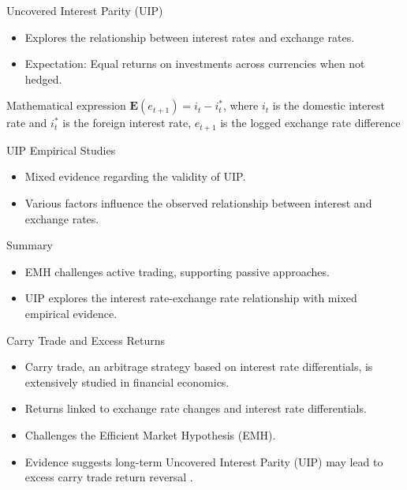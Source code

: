 \documentclass{beamer}
\begin{document}
\begin{frame}{Uncovered Interest Parity (UIP)}
    \begin{itemize}
        \item Explores the relationship between interest rates and exchange rates.
        \item Expectation: Equal returns on investments across currencies when not hedged.
    \end{itemize}

    \begin{block}{Mathematical expression}
    \( \mathbf{E}(e_{t+1}) = i_t - i^*_t \), where $i_t$ is the domestic interest rate and $i^*_t$ is the foreign interest rate, $e_{t+1}$ is the logged exchange rate difference
    \end{block}
\end{frame}

\begin{frame}{UIP Empirical Studies}
    \begin{itemize}
        \item Mixed evidence regarding the validity of UIP.
        \item Various factors influence the observed relationship between interest and exchange rates.
    \end{itemize}
\end{frame}

\begin{frame}{Summary}
    \begin{itemize}
        \item EMH challenges active trading, supporting passive approaches.
        \item UIP explores the interest rate-exchange rate relationship with mixed empirical evidence.
    \end{itemize}
\end{frame}

\begin{frame}{Carry Trade and Excess Returns}
    \begin{itemize}
        \item Carry trade, an arbitrage strategy based on interest rate differentials, is extensively studied in financial economics.
        \item Returns linked to exchange rate changes and interest rate differentials.
        \item Challenges the Efficient Market Hypothesis (EMH).
        \item Evidence suggests long-term Uncovered Interest Parity (UIP) may lead to excess carry trade return reversal \cite{wang2021machine}.
    \end{itemize}
\end{frame}
\end{document}
